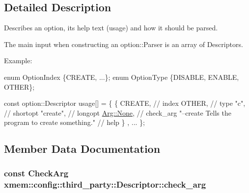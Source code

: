 \subsection{Detailed Description}
Describes an option, its help text (usage) and how it should be parsed. 

The main input when constructing an option\+::\+Parser is an array of Descriptors.

\begin{DoxyParagraph}{Example\+:}

\begin{DoxyCode}
\textcolor{keyword}{enum} OptionIndex \{CREATE, ...\};
\textcolor{keyword}{enum} OptionType \{DISABLE, ENABLE, OTHER\};

\textcolor{keyword}{const} option::Descriptor usage[] = \{
  \{ CREATE,                                            \textcolor{comment}{// index}
    OTHER,                                             \textcolor{comment}{// type}
    \textcolor{stringliteral}{"c"},                                               \textcolor{comment}{// shortopt}
    \textcolor{stringliteral}{"create"},                                          \textcolor{comment}{// longopt}
    \hyperlink{structxmem_1_1config_1_1third__party_1_1_arg_afdfd4a0adea72c759ec04bf5feaf3ec0}{Arg::None},                                         \textcolor{comment}{// check\_arg}
    \textcolor{stringliteral}{"--create  Tells the program to create something."} \textcolor{comment}{// help}
  \}
  , ...
\};
\end{DoxyCode}
 
\end{DoxyParagraph}


\subsection{Member Data Documentation}
\hypertarget{structxmem_1_1config_1_1third__party_1_1_descriptor_a65b39f8d61de820bb5001d590e7dea5d}{}
\subsubsection[{check\+\_\+arg}]{\setlength{\rightskip}{0pt plus 5cm}const Check\+Arg xmem\+::config\+::third\+\_\+party\+::\+Descriptor\+::check\+\_\+arg}\label{structxmem_1_1config_1_1third__party_1_1_descriptor_a65b39f8d61de820bb5001d590e7dea5d}


